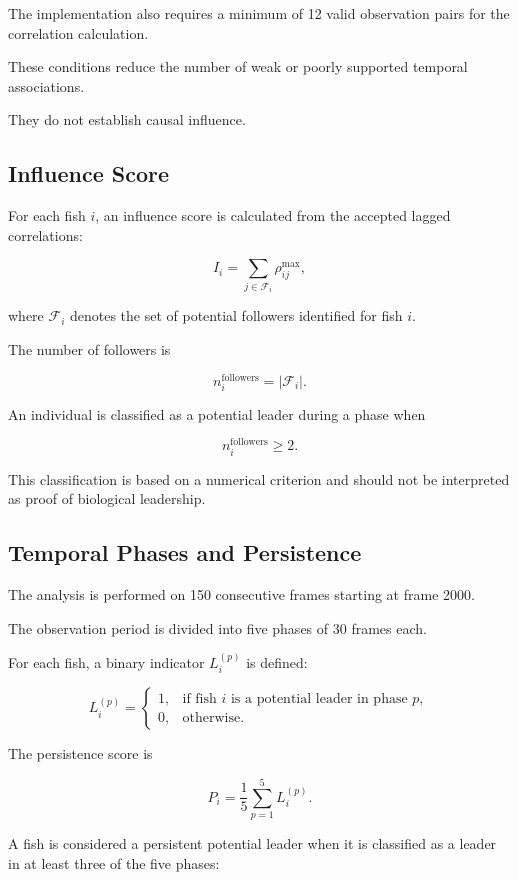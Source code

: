 \documentclass[10pt,a4paper]{article}
\begin{document}
The implementation also
requires a minimum of
12 valid observation pairs
for the correlation
calculation.

These conditions reduce
the number of weak or
poorly supported
temporal associations.

They do not establish
causal influence.

\subsection{Influence Score}

For each fish $i$,
an influence score is
calculated from the
accepted lagged
correlations:

\[
I_i
=
\sum_{j\in\mathcal F_i}
\rho_{ij}^{\max},
\]

where $\mathcal F_i$
denotes the set of
potential followers
identified for fish $i$.

The number of followers is

\[
n_i^{\mathrm{followers}}
=
|\mathcal F_i|.
\]

An individual is classified
as a potential leader
during a phase when

\[
n_i^{\mathrm{followers}}\geq 2.
\]

This classification
is based on a numerical
criterion and should
not be interpreted as
proof of biological
leadership.

\subsection{Temporal Phases and Persistence}

The analysis is performed
on 150 consecutive frames
starting at frame 2000.

The observation period
is divided into five phases
of 30 frames each.

For each fish,
a binary indicator
$L_i^{(p)}$ is defined:

\[
L_i^{(p)}
=
\begin{cases}
1, & \text{if fish }i
\text{ is a potential leader in phase }p,\\
0, & \text{otherwise}.
\end{cases}
\]

The persistence score is

\[
P_i
=
\frac{1}{5}
\sum_{p=1}^{5}
L_i^{(p)}.
\]

A fish is considered
a persistent potential
leader when it is
classified as a leader
in at least three
of the five phases:
\end{document}
